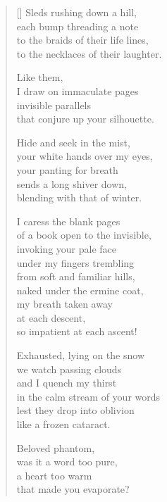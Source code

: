 \documentclass[twocolumn,11pt]{article}
\begin{document}
\thispagestyle{empty}

\poemtitle{}

\settowidth{\versewidth}{in the calm stream of your words}

\bigskip

\begin{verse}[\versewidth]
  Sleds rushing down a hill, \\
  each bump threading a note \\
  to the braids of their life lines, \\
  to the necklaces of their laughter.

  Like them, \\
  I draw on immaculate pages \\
  invisible parallels \\
  that conjure up your silhouette.

  Hide and seek in the mist, \\
  your white hands over my eyes, \\
  your panting for breath \\
  sends a long shiver down, \\
  blending with that of winter.

  I caress the blank pages \\
  of a book open to the invisible, \\
  invoking your pale face \\
  under my fingers trembling \\
  from soft and familiar hills, \\
  naked under the ermine coat, \\
  my breath taken away \\
  at each descent, \\
  so impatient at each ascent!

  Exhausted, lying on the snow \\
  we watch passing clouds \\
  and I quench my thirst \\
  in the calm stream of your words \\
  lest they drop into oblivion \\
  like a frozen cataract.

  \newpage

  Beloved phantom, \\
  was it a word too pure, \\
  a heart too warm \\
  that made you evaporate?


\end{verse}
\end{document}
